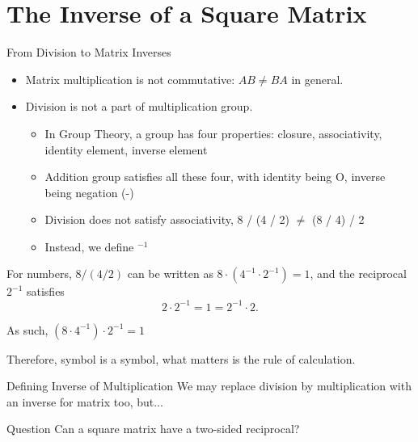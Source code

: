 \section[Inverse matrices]{The Inverse of a Square Matrix}


\begin{frame}{From Division to Matrix Inverses}
\begin{itemize}
  \item Matrix multiplication is not commutative: $AB\ne BA$ in general.
  \item Division is not a part of multiplication group.
  \begin{itemize}
    \item In Group Theory, a group has four properties: closure, associativity, identity element, inverse element
    \item Addition group satisfies all these four, with identity being O, inverse being negation (-)
    \item Division does not satisfy associativity, 8 / (4 / 2) $\neq$ (8 / 4) / 2
    \item Instead, we define $^{-1}$
  \end{itemize}
\end{itemize}
\medskip

For numbers, $8/(4/2)$ can be written as $8\cdot(4^{-1}\cdot2^{-1})=1$, and the reciprocal $2^{-1}$ satisfies
\[
2\cdot2^{-1}=1=2^{-1}\cdot2.
\]

As such, $(8\cdot4^{-1})\cdot2^{-1}=1$

Therefore, symbol is a symbol, what matters is the rule of calculation.

\end{frame}

\begin{frame}{Defining Inverse of Multiplication}
We may replace division by multiplication with an inverse for matrix too, but...\pause

\begin{alertblock}{Question}
Can a square matrix have a two-sided reciprocal?
\end{alertblock}

\end{frame}

